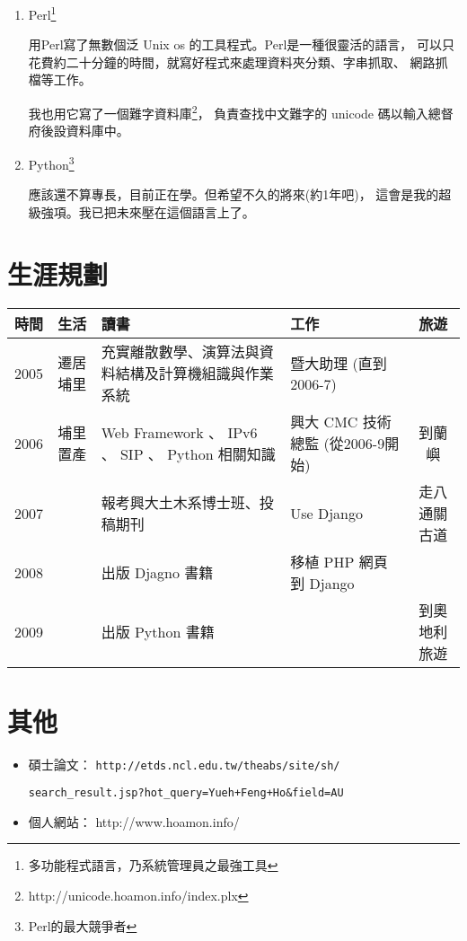 \documentclass[12pt,a4paper]{article}
\begin{document}
\begin{CJK}{UTF8}{bsmi}
\begin{enumerate}
        寫了幾個小網站。與老婆一起協助幫忙縣政府財產課寫了一個土地管理系統%
        \footnote{http://163.22.168.29/}，此專案運用了 FPDF 模組，%
        另外還有自己的網站\footnote{http://www.hoamon.info/}以及 TWD 網頁開發框架。
        \item Perl\footnote{多功能程式語言，乃系統管理員之最強工具}

        用Perl寫了無數個泛 Unix os 的工具程式。Perl是一種很靈活的語言，%
        可以只花費約二十分鐘的時間，就寫好程式來處理資料夾分類、字串抓取、%
        網路抓檔等工作。

        我也用它寫了一個難字資料庫\footnote{http://unicode.hoamon.info/index.plx}，%
        負責查找中文難字的 unicode 碼以輸入總督府後設資料庫中。
        \item Python\footnote{Perl的最大競爭者}

        應該還不算專長，目前正在學。但希望不久的將來(約1年吧)，%
        這會是我的超級強項。我已把未來壓在這個語言上了。
    \end{enumerate}
    \section{生涯規劃}
    \renewcommand{\multirowsetup}{\centering} 
    \begin{tabular}{|l|c|p{6cm}|p{3cm}|c|} \hline
    時間 & 生活 & 讀書 & 工作 & 旅遊 \\ \hline
    2005 & 遷居埔里 & 充實離散數學、演算法與資料結構及計算機組識與作業系統%
        & 暨大助理 (直到2006-7) & \\ \hline
    2006 & 埔里置產 & Web Framework 、 IPv6 、 SIP 、 Python 相關知識%
        & 興大 CMC 技術總監 (從2006-9開始) & 到蘭嶼 \\ \hline
    2007 & & 報考興大土木系博士班、投稿期刊  & Use Django & 走八通關古道 \\ \hline
    2008 & & 出版 Djagno 書籍 & 移植 PHP 網頁到 Django & \\ \hline
    2009 & & 出版 Python 書籍 &  & 到奧地利旅遊 \\ \hline
    \end{tabular}
    \section{其他}
    \begin{itemize}
        \item 碩士論文： \verb|http://etds.ncl.edu.tw/theabs/site/sh/|

        \verb|search_result.jsp?hot_query=Yueh+Feng+Ho&field=AU|
        \item 個人網站： http://www.hoamon.info/
    \end{itemize}
\end{CJK}
\end{document}
